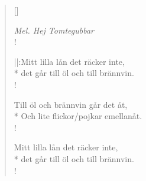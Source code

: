 
\settowidth{\versewidth}{Till öl och brännvin går det åt,}



\begin{verse}[\versewidth]

\flagverse{}
\emph{Mel. Hej Tomtegubbar}\\!

||:Mitt lilla lån det räcker inte,\\*
det går till öl och till brännvin.\\!


Till öl och brännvin går det åt,\\*
Och lite flickor/pojkar emellanåt.\\!


Mitt lilla lån det räcker inte,\\*
det går till öl och till brännvin.\\!


\end{verse}

